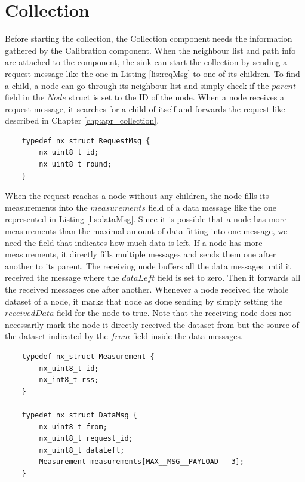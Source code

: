 \section{Collection}
\label{chp:imp_collection}
Before starting the collection, the Collection component needs the information gathered by the Calibration component. When the neighbour list and path info are attached to the component, the sink can start the collection by sending a request message like the one in Listing \ref{lis:reqMsg} to one of its children. To find a child, a node can go through its neighbour list and simply check if the $parent$ field in the $Node$ struct is set to the ID of the node. When a node receives a request message, it searches for a child of itself and forwards the request like described in Chapter \ref{chp:apr_collection}.

\begin{lstlisting}
	typedef nx_struct RequestMsg {
		nx_uint8_t id;
		nx_uint8_t round;
	}
\end{lstlisting}

When the request reaches a node without any children, the node fills its measurements into the $measurements$ field of a data message like the one represented in Listing \ref{lis:dataMsg}.
Since it is possible that a node has more measurements than the maximal amount of data fitting into one message, we need the field that indicates how much data is left. If a node has more measurements, it directly fills multiple messages and sends them one after another to its parent. The receiving node buffers all the data messages until it received the message where the $dataLeft$ field is set to zero. Then it forwards all the received messages one after another. Whenever a node received the whole dataset of a node, it marks that node as done sending by simply setting the $receivedData$ field for the node to true. Note that the receiving node does not necessarily mark the node it directly received the dataset from but the source of the dataset indicated by the $from$ field inside the data messages.

\begin{lstlisting}
	typedef nx_struct Measurement {
		nx_uint8_t id;
		nx_int8_t rss;
	}

	typedef nx_struct DataMsg {
		nx_uint8_t from;
		nx_uint8_t request_id;
		nx_uint8_t dataLeft;
		Measurement measurements[MAX__MSG__PAYLOAD - 3];
	}
\end{lstlisting}

